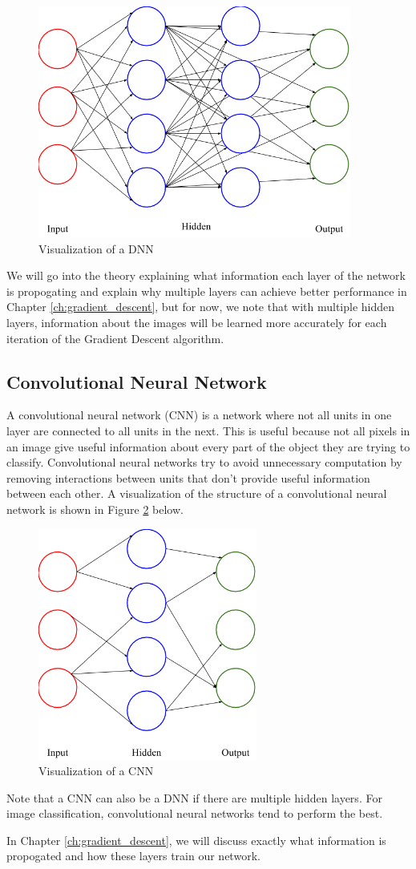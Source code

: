 \begin{figure}[ht!]
\centering
\includegraphics[height=3in]{../figures/deep_nn.png}
\caption{Visualization of a DNN}
\label{fig:dnn}
\end{figure}

We will go into the theory explaining what information each layer of the
network is propogating and explain why multiple layers can achieve better
performance in Chapter \ref{ch:gradient_descent}, but for now, we note that
with multiple hidden layers, information about the images will be learned more
accurately for each iteration of the Gradient Descent algorithm.

\subsection{Convolutional Neural Network}
A convolutional neural network (CNN) is a network where not all units in one
layer are connected to all units in the next. This is useful because not all
pixels in an image give useful information about every part of the object they
are trying to classify. Convolutional neural networks try to avoid unnecessary
computation by removing interactions between units that don't provide useful
information between each other. A visualization of the structure of a
convolutional neural network is shown in Figure \ref{fig:cnn} below.

\begin{figure}[ht!]
\centering
\includegraphics[height=3in]{../figures/convolutional_nn.png}
\caption{Visualization of a CNN}
\label{fig:cnn}
\end{figure}

Note that a CNN can also be a DNN if there are multiple hidden layers. For
image classification, convolutional neural networks tend to perform the best.

\noindent In Chapter \ref{ch:gradient_descent}, we will discuss exactly what
information is propogated and how these layers train our network.
